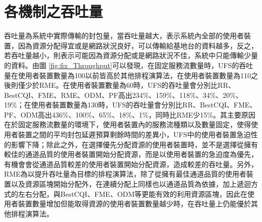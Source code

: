 \section{各機制之吞吐量}
吞吐量為系統中實際傳輸的封包量，當吞吐量越大，表示系統內全部的使用者裝置，因為資源分配得宜或是網路狀況良好，可以傳輸給基地台的資料越多，反之，若吞吐量越小，則表示可能因為資源分配或是網路狀況不佳，系統中只能傳輸少量的資料。由圖 \ref{fig:fix_Throughput}可以發現，在固定服務流數量時，UFS的吞吐量在使用者裝置數量為100以前皆高於其他排程演算法，在使用者裝置數量為110之後則僅少於RME。在使用者裝置數量為60時，UFS的吞吐量會分別比RR、BestCQI、FME、RME、ODM、PF高出234\%、159\%、118\%、34\%、20\%、19\%；在使用者裝置數量為130時，UFS的吞吐量會分別比RR、BestCQI、FME、PF、ODM高出436\%、100\%、65\%、18\%、1\%，同時比RME少15\%。其主要原因在於固定服務流數量的環境下，使用者裝置內的服務流種類以及數量固定，使得使用者裝置之間的平均封包延遲預算剩餘時間的差異小，UFS中的使用者裝置急迫性的影響下降；除此之外，在選擇優先分配資源的使用者裝置時，並不是選擇從擁有較佳的通道品質的使用者裝置開始分配資源，而是以使用者裝置的急迫度為優先，有機會會從通道品質較差的使用者裝置開始分配資源，造成較差的吞吐量。另外，RME為以提升吞吐量為目標的排程演算法，除了從擁有最佳通道品質的使用者裝置以及資源區塊開始分配外，在連續分配上同樣也以通道品質為依據，加上遞迴方式的左右分配，與BestCQI、FME、ODM等更能有效的利用資源區塊，因此在使用者裝置數量增加但能取得資源的使用者裝置數量越少時，在吞吐量上仍能優於其他排程演算法。

